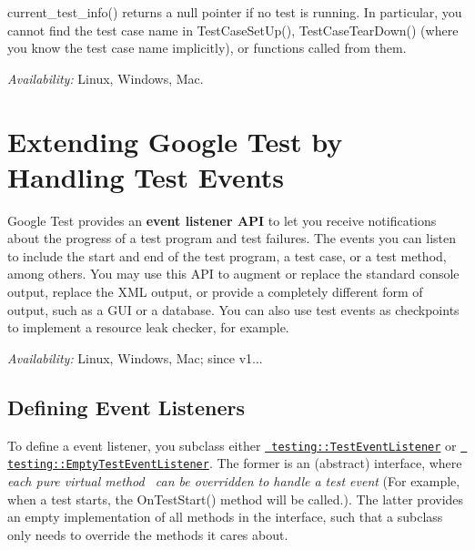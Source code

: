 \begin{DoxyCode}{0}
\end{DoxyCode}


{\ttfamily current\+\_\+test\+\_\+info()} returns a null pointer if no test is running. In particular, you cannot find the test case name in {\ttfamily Test\+Case\+Set\+Up()}, {\ttfamily Test\+Case\+Tear\+Down()} (where you know the test case name implicitly), or functions called from them.

{\itshape Availability\+:} Linux, Windows, Mac.

\section*{Extending Google Test by Handling Test Events}

Google Test provides an {\bfseries{event listener A\+PI}} to let you receive notifications about the progress of a test program and test failures. The events you can listen to include the start and end of the test program, a test case, or a test method, among others. You may use this A\+PI to augment or replace the standard console output, replace the X\+ML output, or provide a completely different form of output, such as a G\+UI or a database. You can also use test events as checkpoints to implement a resource leak checker, for example.

{\itshape Availability\+:} Linux, Windows, Mac; since v1...

\subsection*{Defining Event Listeners}

To define a event listener, you subclass either \href{../include/gtest/gtest.h#L991}\texttt{ testing\+::\+Test\+Event\+Listener} or \href{../include/gtest/gtest.h#L1044}\texttt{ testing\+::\+Empty\+Test\+Event\+Listener}. The former is an (abstract) interface, where {\itshape each pure virtual method~\newline
 can be overridden to handle a test event} (For example, when a test starts, the {\ttfamily On\+Test\+Start()} method will be called.). The latter provides an empty implementation of all methods in the interface, such that a subclass only needs to override the methods it cares about.

